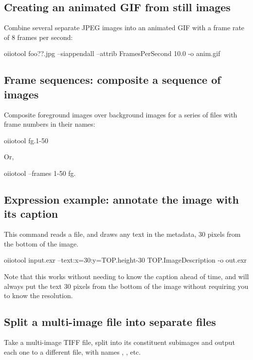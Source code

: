 \subsection*{Creating an animated GIF from still images}
 

\noindent Combine several separate JPEG images into an animated GIF with
a frame rate of 8 frames per second:

\begin{code}
    oiiotool foo??.jpg --siappendall --attrib FramesPerSecond 10.0 -o anim.gif
\end{code}


\subsection*{Frame sequences: composite a sequence of images}

\noindent Composite foreground images over background images for a
series of files with frame numbers in their names:
\begin{code}
    oiiotool fg.1-50%
\end{code}

\noindent Or,
\begin{code}
    oiiotool --frames 1-50 fg.%
\end{code}


\subsection*{Expression example: annotate the image with its caption}

\noindent This command reads a file, and draws any text in the
 metadata, 30 pixels from the bottom of the image.
\begin{code}
    oiiotool input.exr --text:x=30:y={TOP.height-30} {TOP.ImageDescription} -o out.exr
\end{code}
\noindent Note that this works without needing to know the caption ahead
of time, and will always put the text 30 pixels from the bottom of the image
without requiring you to know the resolution.


\subsection{Split a multi-image file into separate files}
\noindent Take a multi-image TIFF file, split into its constituent subimages
and output each one to a different file, with names ,
, etc.


